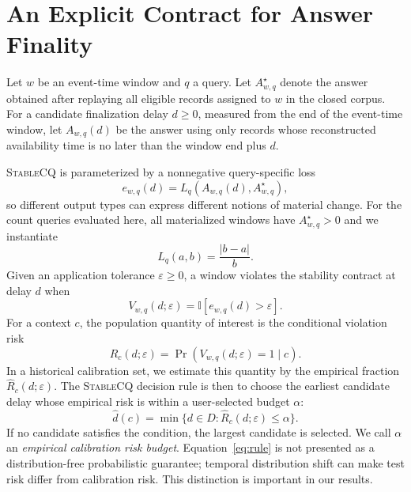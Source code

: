 \documentclass[conference]{IEEEtran}
\newcommand{\stablecq}{\textsc{StableCQ}}
\newcommand{\eps}{\varepsilon}
\begin{document}
\section{An Explicit Contract for Answer Finality}
Let $w$ be an event-time window and $q$ a query. Let $A_{w,q}^{\star}$ denote the answer obtained after replaying all eligible records assigned to $w$ in the closed corpus. For a candidate finalization delay $d\geq 0$, measured from the end of the event-time window, let $A_{w,q}(d)$ be the answer using only records whose reconstructed availability time is no later than the window end plus $d$.

\stablecq{} is parameterized by a nonnegative query-specific loss
\begin{equation}
 e_{w,q}(d)=L_q\!\left(A_{w,q}(d),A_{w,q}^{\star}\right),
 \label{eq:error}
\end{equation}
so different output types can express different notions of material change. For the count queries evaluated here, all materialized windows have $A_{w,q}^{\star}>0$ and we instantiate
\begin{equation}
 L_q(a,b)=\frac{|b-a|}{b}.
 \label{eq:relerr}
\end{equation}
Given an application tolerance $\eps\geq 0$, a window violates the stability contract at delay $d$ when
\begin{equation}
 V_{w,q}(d;\eps)=\mathbb{I}[e_{w,q}(d)>\eps].
 \label{eq:violation}
\end{equation}
For a context $c$, the population quantity of interest is the conditional violation risk
\begin{equation}
 R_c(d;\eps)=\Pr(V_{w,q}(d;\eps)=1\mid c).
 \label{eq:risk}
\end{equation}
In a historical calibration set, we estimate this quantity by the empirical fraction $\widehat R_c(d;\eps)$. The \stablecq{} decision rule is then to choose the earliest candidate delay whose empirical risk is within a user-selected budget $\alpha$:
\begin{equation}
 \widehat d(c)=\min\{d\in D:\widehat R_c(d;\eps)\leq \alpha\}.
 \label{eq:rule}
\end{equation}
If no candidate satisfies the condition, the largest candidate is selected. We call $\alpha$ an \emph{empirical calibration risk budget}. Equation~\eqref{eq:rule} is not presented as a distribution-free probabilistic guarantee; temporal distribution shift can make test risk differ from calibration risk. This distinction is important in our results.
\end{document}
